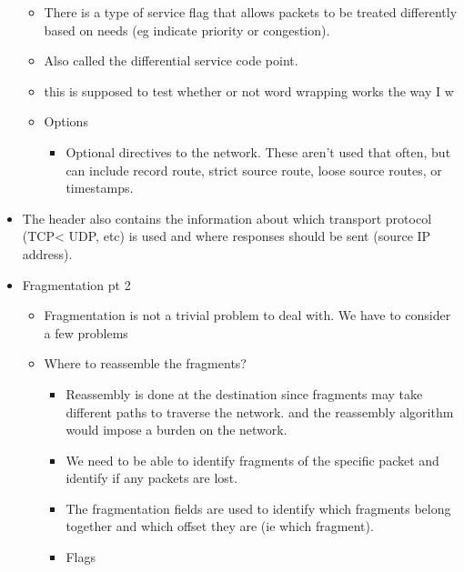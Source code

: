\documentclass[]{article}
\providecommand{\tightlist}{%
  \setlength{\itemsep}{0pt}\setlength{\parskip}{0pt}}
\begin{document}
\begin{itemize}
  \begin{itemize}
  \tightlist
  \item
    There is a type of service flag that allows packets to be treated
    differently based on needs (eg indicate priority or congestion).
  \item
    Also called the differential service code point.\\
  \item
    this is supposed to test whether or not word wrapping works the way
    I w
  \item
    Options

    \begin{itemize}
    \tightlist
    \item
      Optional directives to the network. These aren't used that often,
      but can include record route, strict source route, loose source
      routes, or timestamps.
    \end{itemize}
  \end{itemize}
\item
  The header also contains the information about which transport
  protocol (TCP\textless{} UDP, etc) is used and where responses should
  be sent (source IP address).
\item
  Fragmentation pt 2

  \begin{itemize}
  \tightlist
  \item
    Fragmentation is not a trivial problem to deal with. We have to
    consider a few problems
  \item
    Where to reassemble the fragments?

    \begin{itemize}
    \tightlist
    \item
      Reassembly is done at the destination since fragments may take
      different paths to traverse the network. and the reassembly
      algorithm would impose a burden on the network.
    \item
      We need to be able to identify fragments of the specific packet
      and identify if any packets are lost.
    \item
      The fragmentation fields are used to identify which fragments
      belong together and which offset they are (ie which fragment).
    \item
      Flags


\end{itemize}
\end{itemize}
\end{itemize}
\end{document}
